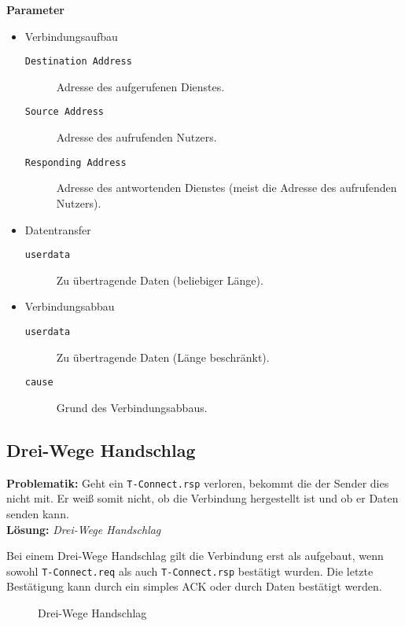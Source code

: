 			\textbf{Parameter}
			\begin{itemize}
				\item Verbindungsaufbau
					\begin{description}
						\item[\texttt{Destination Address}] Adresse des aufgerufenen Dienstes.
						\item[\texttt{Source Address}] Adresse des aufrufenden Nutzers.
						\item[\texttt{Responding Address}] Adresse des antwortenden Dienstes (meist die Adresse des aufrufenden Nutzers).
					\end{description}
				\item Datentransfer
					\begin{description}
						\item[\texttt{userdata}] Zu übertragende Daten (beliebiger Länge).
					\end{description}
				\item Verbindungsabbau
					\begin{description}
						\item[\texttt{userdata}] Zu übertragende Daten (Länge beschränkt).
						\item[\texttt{cause}] Grund des Verbindungsabbaus.
					\end{description}
			\end{itemize}

		\subsection{Drei-Wege Handschlag} %
			\textbf{Problematik:} Geht ein \texttt{T-Connect.rsp} verloren, bekommt die der Sender dies nicht mit. Er weiß somit nicht, ob die Verbindung hergestellt ist und ob er Daten senden kann. \\
			\textbf{Lösung:} \textit{Drei-Wege Handschlag}

			Bei einem Drei-Wege Handschlag gilt die Verbindung erst als aufgebaut, wenn sowohl \texttt{T-Connect.req} als auch \texttt{T-Connect.rsp} bestätigt wurden. Die letzte Bestätigung kann durch ein simples ACK oder durch Daten bestätigt werden.


			\begin{figure}[H]
				\centering
				\caption{Drei-Wege Handschlag}
			\end{figure}

